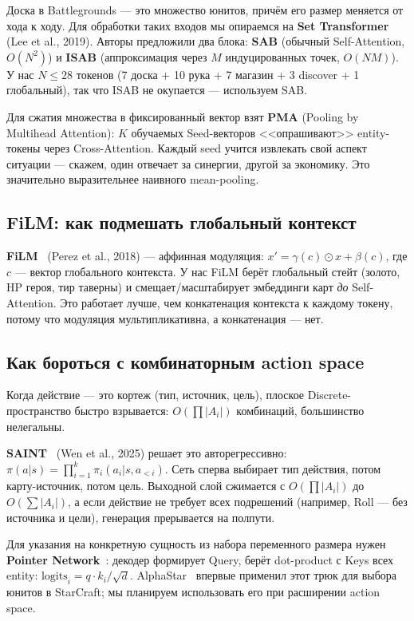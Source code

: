 \documentclass[a4paper,12pt]{extarticle}
\begin{document}
Доска в Battlegrounds --- это множество юнитов, причём его размер меняется от хода к ходу. Для обработки таких входов мы опираемся на \textbf{Set Transformer}~\cite{set_transformer} (Lee et al., 2019). Авторы предложили два блока: \textbf{SAB} (обычный Self-Attention, $O(N^2)$) и \textbf{ISAB} (аппроксимация через $M$ индуцированных точек, $O(NM)$). У нас $N \leq 28$ токенов (7 доска + 10 рука + 7 магазин + 3 discover + 1 глобальный), так что ISAB не окупается --- используем SAB.

Для сжатия множества в фиксированный вектор взят \textbf{PMA} (Pooling by Multihead Attention): $K$ обучаемых Seed-векторов <<опрашивают>> entity-токены через Cross-Attention. Каждый seed учится извлекать свой аспект ситуации --- скажем, один отвечает за синергии, другой за экономику. Это значительно выразительнее наивного mean-pooling.

\subsection{FiLM: как подмешать глобальный контекст}

\textbf{FiLM}~\cite{film} (Perez et al., 2018) --- аффинная модуляция: $x' = \gamma(c) \odot x + \beta(c)$, где $c$ --- вектор глобального контекста. У нас FiLM берёт глобальный стейт (золото, HP героя, тир таверны) и смещает/масштабирует эмбеддинги карт \emph{до} Self-Attention. Это работает лучше, чем конкатенация контекста к каждому токену, потому что модуляция мультипликативна, а конкатенация --- нет.


\subsection{Как бороться с комбинаторным action space}

Когда действие --- это кортеж (тип, источник, цель), плоское Discrete-пространство быстро взрывается: $O(\prod |A_i|)$ комбинаций, большинство нелегальны.

\textbf{SAINT}~\cite{saint} (Wen et al., 2025) решает это авторегрессивно: $\pi(a|s) = \prod_{i=1}^{k} \pi_i(a_i | s, a_{<i})$. Сеть сперва выбирает тип действия, потом карту-источник, потом цель. Выходной слой сжимается с $O(\prod |A_i|)$ до $O(\sum |A_i|)$, а если действие не требует всех подрешений (например, Roll --- без источника и цели), генерация прерывается на полпути.

Для указания на конкретную сущность из набора переменного размера нужен \textbf{Pointer Network}~\cite{pointer}: декодер формирует Query, берёт dot-product с Keys всех entity: $\text{logits}_i = q \cdot k_i / \sqrt{d}$. AlphaStar~\cite{alphastar} впервые применил этот трюк для выбора юнитов в StarCraft; мы планируем использовать его при расширении action space.
\end{document}
